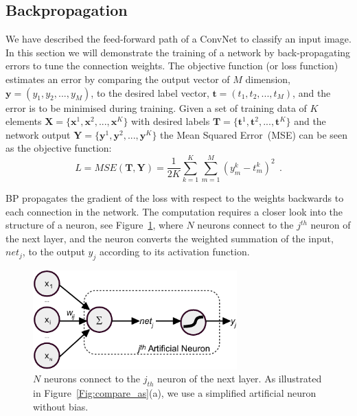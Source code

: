 \subsection{Backpropagation}
We have described the feed-forward path of a ConvNet to classify an input image.
In this section we will demonstrate the training of a network by back-propagating errors to tune the connection weights.
The objective function (or loss function) estimates an error by comparing the output vector of $M$ dimension, $\mathbf{y}=(y_1,y_2,...,y_M)$, to the desired label vector, $\mathbf{t}=(t_1,t_2,...,t_M)$, and the error is to be minimised during training.
Given a set of training data of $K$ elements $\mathbf{X}=\{\mathbf{x}^1, \mathbf{x}^2, ..., \mathbf{x}^K\}$ with desired labels $\mathbf{T}=\{\mathbf{t}^1, \mathbf{t}^2, ..., \mathbf{t}^K\}$ and the network output $\mathbf{Y}=\{\mathbf{y}^1, \mathbf{y}^2, ..., \mathbf{y}^K\}$ the Mean Squared Error~(MSE) can be seen as the objective function:  
\begin{equation}
L={MSE}(\mathbf{T}, \mathbf{Y}) =\frac{1}{2K}\sum_{k=1}^K \sum_{m=1}^M (y^{k}_{m}-t^{k}_{m})^{2}~~.
\label{equ:loss_all}
\end{equation}

BP propagates the gradient of the loss with respect to the weights backwards to each connection in the network.
The computation requires a closer look into the structure of a neuron, see Figure~\ref{Fig:neuron_net}, where $N$ neurons connect to the $j^{th}$ neuron of the next layer, and the neuron converts the weighted summation of the input, $net_j$, to the output $y_j$ according to its activation function.
\begin{figure}[bt]
	\centering
	\includegraphics[width=0.7\textwidth]{pics_iconip/neuron.pdf}
	\caption[An artificial neuron.]{$N$ neurons connect to the $j_{th}$ neuron of the next layer. As illustrated in Figure~\ref{Fig:compare_as}(a), we use a simplified artificial neuron without bias.}
	\label{Fig:neuron_net}
\end{figure}

